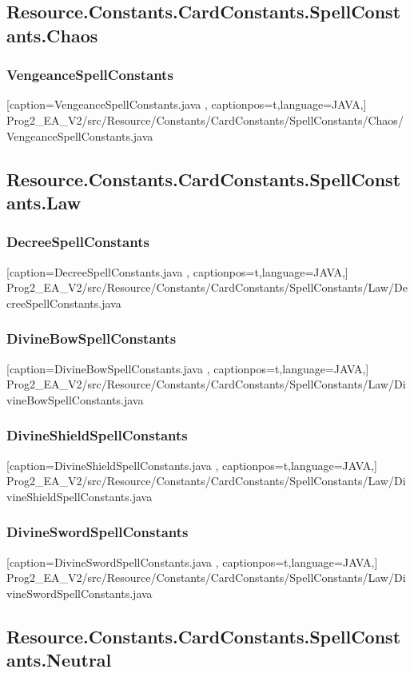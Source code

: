 \documentclass[a4paper,12pt]{scrartcl}
\begin{document}
	\subsection{Resource.Constants.CardConstants.SpellConstants.Chaos}
	\subsubsection{VengeanceSpellConstants}
	
	[caption={VengeanceSpellConstants.java}
	\label{lst:javaclass},
	captionpos=t,language=JAVA,]
	{Prog2_EA_V2/src/Resource/Constants/CardConstants/SpellConstants/Chaos/VengeanceSpellConstants.java}
	\subsection{Resource.Constants.CardConstants.SpellConstants.Law}
	\subsubsection{DecreeSpellConstants}
	
	[caption={DecreeSpellConstants.java}
	\label{lst:javaclass},
	captionpos=t,language=JAVA,]
	{Prog2_EA_V2/src/Resource/Constants/CardConstants/SpellConstants/Law/DecreeSpellConstants.java}
	\subsubsection{DivineBowSpellConstants}
	
	[caption={DivineBowSpellConstants.java}
	\label{lst:javaclass},
	captionpos=t,language=JAVA,]
	{Prog2_EA_V2/src/Resource/Constants/CardConstants/SpellConstants/Law/DivineBowSpellConstants.java}
	\subsubsection{DivineShieldSpellConstants}
	
	[caption={DivineShieldSpellConstants.java}
	\label{lst:javaclass},
	captionpos=t,language=JAVA,]
	{Prog2_EA_V2/src/Resource/Constants/CardConstants/SpellConstants/Law/DivineShieldSpellConstants.java}
	\subsubsection{DivineSwordSpellConstants}
	
	[caption={DivineSwordSpellConstants.java}
	\label{lst:javaclass},
	captionpos=t,language=JAVA,]
	{Prog2_EA_V2/src/Resource/Constants/CardConstants/SpellConstants/Law/DivineSwordSpellConstants.java}
	\subsection{Resource.Constants.CardConstants.SpellConstants.Neutral}
\end{document}
